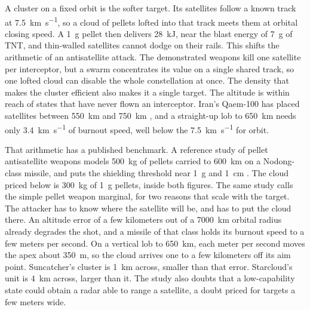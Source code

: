 \documentclass{article}
\begin{document}
A cluster on a fixed orbit is the softer target. Its satellites follow a known track at \SI{7.5}{\kilo\meter\per\second}, so a cloud of pellets lofted into that track meets them at orbital closing speed. A \SI{1}{\gram} pellet then delivers \SI{28}{\kilo\joule}, near the blast energy of \SI{7}{\gram} of TNT, and thin-walled satellites cannot dodge on their rails. This shifts the arithmetic of an antisatellite attack. The demonstrated weapons kill one satellite per interceptor, but a swarm concentrates its value on a single shared track, so one lofted cloud can disable the whole constellation at once. The density that makes the cluster efficient also makes it a single target. The altitude is within reach of states that have never flown an interceptor. Iran's Qaem-100 has placed satellites between \SI{550}{\kilo\meter} and \SI{750}{\kilo\meter} \cite{aljazeera2024_chamran}, and a straight-up lob to \SI{650}{\kilo\meter} needs only \SI{3.4}{\kilo\meter\per\second} of burnout speed, well below the \SI{7.5}{\kilo\meter\per\second} for orbit.

That arithmetic has a published benchmark. A reference study of pellet antisatellite weapons models \SI{500}{\kilo\gram} of pellets carried to \SI{600}{\kilo\meter} on a Nodong-class missile, and puts the shielding threshold near \SI{1}{\gram} and \SI{1}{\centi\meter} \cite{wright2005_physics_space_security}. The cloud priced below is \SI{300}{\kilo\gram} of \SI{1}{\gram} pellets, inside both figures. The same study calls the simple pellet weapon marginal, for two reasons that scale with the target. The attacker has to know where the satellite will be, and has to put the cloud there. An altitude error of a few kilometers out of a \SI{7000}{\kilo\meter} orbital radius already degrades the shot, and a missile of that class holds its burnout speed to a few meters per second. On a vertical lob to \SI{650}{\kilo\meter}, each meter per second moves the apex about \SI{350}{\meter}, so the cloud arrives one to a few kilometers off its aim point. Suncatcher's cluster is \SI{1}{\kilo\meter} across, smaller than that error. Starcloud's unit is \SI{4}{\kilo\meter} across, larger than it. The study also doubts that a low-capability state could obtain a radar able to range a satellite, a doubt priced for targets a few meters wide.
\end{document}
